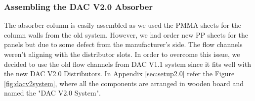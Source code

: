 \subsubsection{Assembling the DAC V2.0 Absorber}

The absorber column is easily assembled as we used the PMMA sheets for the column walls from the old system. However, we had order new PP sheets for the panels but due to some defect from the manufacturer's side. The flow channels weren't aligning with the distributor slots. In order to overcome this issue, we decided to use the old flow channels from DAC V1.1 system since it fits well with the new DAC V2.0 Distributors. In Appendix \ref{sec:setup2.0} refer the Figure \ref{fig:dacv2system}, where all the components are arranged in wooden board and named the "DAC V2.0 System".

